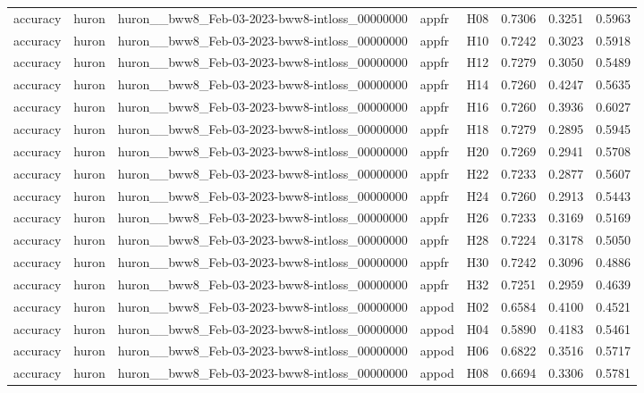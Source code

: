 \begin{table}[tbp]
\begin{tabular}{lllllrrr}
accuracy & huron & huron\_\_bww8\_Feb-03-2023-bww8-intloss\_00000000 & appfr & H08 & 0.7306 & 0.3251 & 0.5963 \\
accuracy & huron & huron\_\_bww8\_Feb-03-2023-bww8-intloss\_00000000 & appfr & H10 & 0.7242 & 0.3023 & 0.5918 \\
accuracy & huron & huron\_\_bww8\_Feb-03-2023-bww8-intloss\_00000000 & appfr & H12 & 0.7279 & 0.3050 & 0.5489 \\
accuracy & huron & huron\_\_bww8\_Feb-03-2023-bww8-intloss\_00000000 & appfr & H14 & 0.7260 & 0.4247 & 0.5635 \\
accuracy & huron & huron\_\_bww8\_Feb-03-2023-bww8-intloss\_00000000 & appfr & H16 & 0.7260 & 0.3936 & 0.6027 \\
accuracy & huron & huron\_\_bww8\_Feb-03-2023-bww8-intloss\_00000000 & appfr & H18 & 0.7279 & 0.2895 & 0.5945 \\
accuracy & huron & huron\_\_bww8\_Feb-03-2023-bww8-intloss\_00000000 & appfr & H20 & 0.7269 & 0.2941 & 0.5708 \\
accuracy & huron & huron\_\_bww8\_Feb-03-2023-bww8-intloss\_00000000 & appfr & H22 & 0.7233 & 0.2877 & 0.5607 \\
accuracy & huron & huron\_\_bww8\_Feb-03-2023-bww8-intloss\_00000000 & appfr & H24 & 0.7260 & 0.2913 & 0.5443 \\
accuracy & huron & huron\_\_bww8\_Feb-03-2023-bww8-intloss\_00000000 & appfr & H26 & 0.7233 & 0.3169 & 0.5169 \\
accuracy & huron & huron\_\_bww8\_Feb-03-2023-bww8-intloss\_00000000 & appfr & H28 & 0.7224 & 0.3178 & 0.5050 \\
accuracy & huron & huron\_\_bww8\_Feb-03-2023-bww8-intloss\_00000000 & appfr & H30 & 0.7242 & 0.3096 & 0.4886 \\
accuracy & huron & huron\_\_bww8\_Feb-03-2023-bww8-intloss\_00000000 & appfr & H32 & 0.7251 & 0.2959 & 0.4639 \\
accuracy & huron & huron\_\_bww8\_Feb-03-2023-bww8-intloss\_00000000 & appod & H02 & 0.6584 & 0.4100 & 0.4521 \\
accuracy & huron & huron\_\_bww8\_Feb-03-2023-bww8-intloss\_00000000 & appod & H04 & 0.5890 & 0.4183 & 0.5461 \\
accuracy & huron & huron\_\_bww8\_Feb-03-2023-bww8-intloss\_00000000 & appod & H06 & 0.6822 & 0.3516 & 0.5717 \\
accuracy & huron & huron\_\_bww8\_Feb-03-2023-bww8-intloss\_00000000 & appod & H08 & 0.6694 & 0.3306 & 0.5781 \\

\end{tabular}
\end{table}
